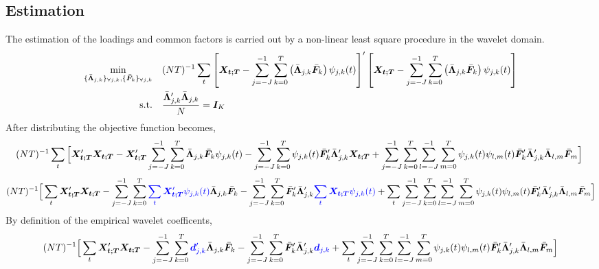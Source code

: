 \documentclass[main_document.tex]{subfiles}
\begin{document}
\subsection{Estimation}
	The estimation of the loadings and common factors is carried out by a non-linear least square procedure in the wavelet domain.
	\begin{align}
		\min_{\setOptLoadings,\setOptFactors} \quad & (NT)^{-1} \sum_t \left[\X{t} - \scalesum{j} \locsum{k} \left(\optLoadings{j}{k} \optFactors{k}\right) \wavelet{j}{k}{t}\right]'\left[\X{t} - \scalesum{j} \locsum{k} \left(\optLoadings{j}{k} \optFactors{k}\right) \wavelet{j}{k}{t}\right]\nonumber \\ 
	\textrm{s.t.} \quad & \frac{\optLoadings{j}{k}'\optLoadings{j}{k}}{N} = \bm{I}_K \label{eq:constraint}
	\end{align}
	After distributing the objective function becomes, 
\small
	\begin{align*}
 (NT)^{-1} \sum_t \Big[\X{t}'\X{t} - \X{t}' \scalesum{j} \locsum{k} \optLoadings{j}{k}\optFactors{k}\wavelet{j}{k}{t}
	-\scalesum{j} \locsum{k} \wavelet{j}{k}{t}\optFactors{k}'\optLoadings{j}{k}' \X{t} 
        + \scalesum{j} \locsum{k} \scalesum{l} \locsum{m} \wavelet{j}{k}{t}\wavelet{l}{m}{t}\optFactors{k}'\optLoadings{j}{k}'\optLoadings{l}{m}\optFactors{m} \Big]\
	\end{align*}
\normalsize
\footnotesize
	\begin{align*}
	 (NT)^{-1} \Big[ \sum_t \X{t}'\X{t} - \scalesum{j} \locsum{k} \textcolor{blue}{\sum_t  \X{t}'\wavelet{j}{k}{t}} \optLoadings{j}{k}\optFactors{k}
		-\scalesum{j} \locsum{k} \optFactors{k}'\optLoadings{j}{k}' \textcolor{blue}{\sum_t  \X{t} \wavelet{j}{k}{t}}
	        + \sum_t \scalesum{j} \locsum{k} \scalesum{l} \locsum{m} \wavelet{j}{k}{t}\wavelet{l}{m}{t}\optFactors{k}'\optLoadings{j}{k}'\optLoadings{l}{m}\optFactors{m} \Big]
	\end{align*}
\normalsize
	By definition of the empirical wavelet coefficents,
\small
	\begin{align*}
	 (NT)^{-1} \Big[ \sum_t \X{t}'\X{t} - \scalesum{j} \locsum{k} \textcolor{blue}{\coeffs{j}{k}'} \optLoadings{j}{k}\optFactors{k}
		-\scalesum{j} \locsum{k} \optFactors{k}'\optLoadings{j}{k}' \textcolor{blue}{\coeffs{j}{k}} 
	       + \sum_t \scalesum{j} \locsum{k} \scalesum{l} \locsum{m} \wavelet{j}{k}{t}\wavelet{l}{m}{t}\optFactors{k}'\optLoadings{j}{k}'\optLoadings{l}{m}\optFactors{m} \Big]
	\end{align*}
\normalsize     			      
\end{document}
